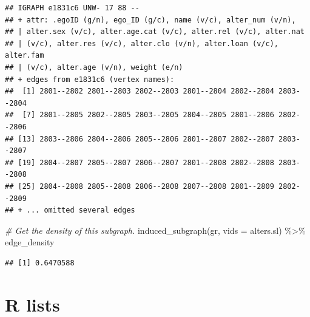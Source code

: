 \documentclass[
]{book}
\newenvironment{Shaded}{\begin{snugshade}}{\end{snugshade}}
\newcommand{\AttributeTok}[1]{\textcolor[rgb]{0.77,0.63,0.00}{#1}}
\newcommand{\CommentTok}[1]{\textcolor[rgb]{0.56,0.35,0.01}{\textit{#1}}}
\newcommand{\FunctionTok}[1]{\textcolor[rgb]{0.00,0.00,0.00}{#1}}
\newcommand{\NormalTok}[1]{#1}
\newcommand{\SpecialCharTok}[1]{\textcolor[rgb]{0.00,0.00,0.00}{#1}}
\begin{document}
\begin{verbatim}
## IGRAPH e1831c6 UNW- 17 88 -- 
## + attr: .egoID (g/n), ego_ID (g/c), name (v/c), alter_num (v/n),
## | alter.sex (v/c), alter.age.cat (v/c), alter.rel (v/c), alter.nat
## | (v/c), alter.res (v/c), alter.clo (v/n), alter.loan (v/c), alter.fam
## | (v/c), alter.age (v/n), weight (e/n)
## + edges from e1831c6 (vertex names):
##  [1] 2801--2802 2801--2803 2802--2803 2801--2804 2802--2804 2803--2804
##  [7] 2801--2805 2802--2805 2803--2805 2804--2805 2801--2806 2802--2806
## [13] 2803--2806 2804--2806 2805--2806 2801--2807 2802--2807 2803--2807
## [19] 2804--2807 2805--2807 2806--2807 2801--2808 2802--2808 2803--2808
## [25] 2804--2808 2805--2808 2806--2808 2807--2808 2801--2809 2802--2809
## + ... omitted several edges
\end{verbatim}

\begin{Shaded}
\begin{Highlighting}[]
\CommentTok{\# Get the density of this subgraph.}
\FunctionTok{induced\_subgraph}\NormalTok{(gr, }\AttributeTok{vids =}\NormalTok{ alters.sl) }\SpecialCharTok{\%\textgreater{}\%} 
\NormalTok{  edge\_density}
\end{Highlighting}
\end{Shaded}

\begin{verbatim}
## [1] 0.6470588
\end{verbatim}

\hypertarget{lists}{%
\section{R lists}\label{lists}}
\end{document}
